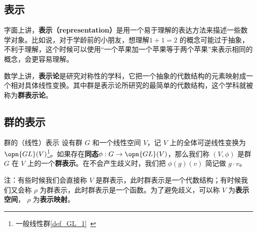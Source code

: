 

\subsection{表示}

字面上讲，\textbf{表示（representation）}是用一个易于理解的表达方法来描述一些数学对象。比如说，对于学龄前的小朋友，想理解$1+1=2$ 的概念可能过于抽象，不利于理解，这个时候可以使用“一个苹果加一个苹果等于两个苹果”来表示相同的概念，会更容易理解。

数学上讲，\textbf{表示论}是研究对称性的学科，它把一个抽象的代数结构的元素映射成一个相对具体线性变换。其中群是表示论所研究的最简单的代数结构，这个学科就被称为\textbf{群表示论}。\cite{GTM222}\cite{维声表示}

\subsection{群的表示}

% 
% 
% 
% 

\begin{definition}{群的（线性）表示}
设有群 $G$ 和一个线性空间 $V$，记 $V$ 上的全体可逆线性变换为 $\opn{GL}(V)$\footnote{一般线性群\autoref{def_GL_1}~}。如果存在\textbf{同态}$\phi: G\rightarrow \opn{GL}(V)$，那么我们称 $(V, \phi)$ 是群 $G$ 在 $V$ 上的一个\textbf{群表示}。在不会产生歧义时，我们把 $\phi(g)(v)$ 简记做 $g \cdot v$。
\end{definition}

注：有些时候我们会直接称 $V$ 是群表示，此时群表示是一个代数结构；有时候我们又会称 $\rho$ 为群表示，此时群表示是一个函数。为了避免歧义，可以称 $V$ 为\textbf{表示空间}， $\rho$ 为\textbf{表示映射}。

